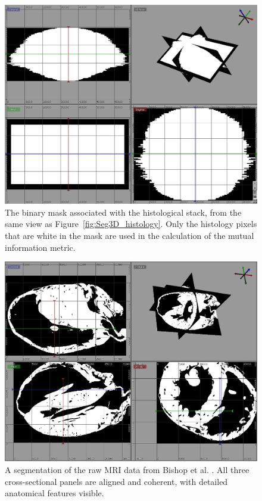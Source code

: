       \begin{landscape}
        \begin{figure}[htbp]
          \centering
          \includegraphics[width=1\textwidth]{Ch6/Figs/Seg3D_mask}
          \caption{The binary mask associated with the histological stack, from the same view as Figure~\ref{fig:Seg3D_histology}. Only the histology pixels that are white in the mask are used in the calculation of the mutual information metric.}
          \label{fig:Seg3D_mask}
        \end{figure}
      \end{landscape}
      
      \begin{landscape}
        \begin{figure}[htbp]
          \centering
          \includegraphics[width=1\textwidth]{Ch6/Figs/Seg3D_MRI}
          \caption{A segmentation of the raw MRI data from Bishop et al. \cite{Bishop:2009p444}. All three cross-sectional panels are aligned and coherent, with detailed anatomical features visible.}
          \label{fig:Seg3D_MRI}
        \end{figure}
      \end{landscape}
    
